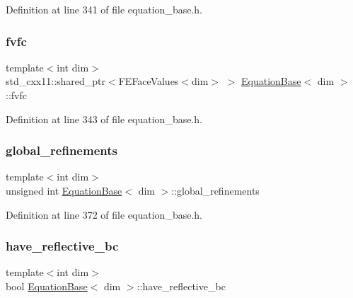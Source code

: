 Definition at line 341 of file equation\+\_\+base.\+h.

\mbox{\label{class_equation_base_a6f6ca8b0e78bcbe0edd07f7967a0a6f9}} 
\subsubsection{\texorpdfstring{fvfc}{fvfc}}
{\footnotesize\ttfamily template$<$int dim$>$ \\
std\+\_\+cxx11\+::shared\+\_\+ptr$<$F\+E\+Face\+Values$<$dim$>$ $>$ \hyperlink{class_equation_base}{Equation\+Base}$<$ dim $>$\+::fvfc\hspace{0.3cm}{\ttfamily [protected]}}



Definition at line 343 of file equation\+\_\+base.\+h.

\mbox{\label{class_equation_base_a9433f3e6cb2251b0b7d0408570677b2e}} 
\subsubsection{\texorpdfstring{global\+\_\+refinements}{global\_refinements}}
{\footnotesize\ttfamily template$<$int dim$>$ \\
unsigned int \hyperlink{class_equation_base}{Equation\+Base}$<$ dim $>$\+::global\+\_\+refinements\hspace{0.3cm}{\ttfamily [protected]}}



Definition at line 372 of file equation\+\_\+base.\+h.

\mbox{\label{class_equation_base_a145ca193add91b43e7a00d6f35c0e1fb}} 
\subsubsection{\texorpdfstring{have\+\_\+reflective\+\_\+bc}{have\_reflective\_bc}}
{\footnotesize\ttfamily template$<$int dim$>$ \\
bool \hyperlink{class_equation_base}{Equation\+Base}$<$ dim $>$\+::have\+\_\+reflective\+\_\+bc\hspace{0.3cm}{\ttfamily [protected]}}



